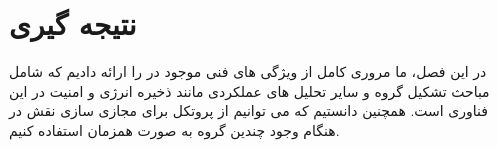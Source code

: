 \section{نتیجه گیری}
در این فصل، ما مروری کامل از ویژگی های فنی موجود در 
را ارائه دادیم که شامل مباحث تشکیل گروه و سایر تحلیل های عملکردی مانند ذخیره انرژی و امنیت در این فناوری است.
 همچنین دانستیم که می توانیم از پروتکل
 برای مجازی سازی نقش
  در هنگام وجود چندین گروه به صورت همزمان استفاده کنیم.

